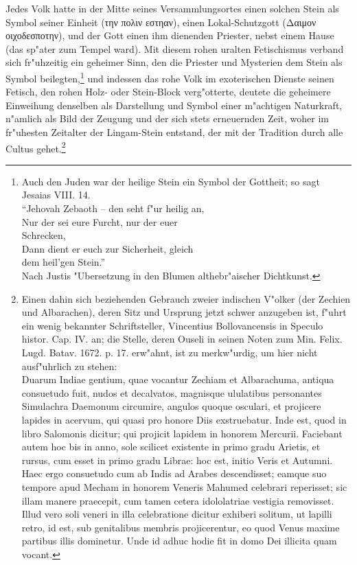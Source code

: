 \documentclass[a4paper, 11pt, oneside, polutonikogreek, german]{article}
\begin{document}
Jedes Volk hatte in der Mitte seines Versammlungsortes einen solchen Stein als Symbol seiner Einheit (την πολιν εστηαν), einen Lokal-Schutzgott (Δαιμον οιχοδεσποτην), und der Gott einen ihm dienenden Priester, nebst einem Hause (das sp"ater zum Tempel ward). Mit diesem rohen uralten Fetischismus verband sich fr"uhzeitig ein geheimer Sinn, den die Priester und Mysterien dem Stein als Symbol beilegten,\footnote{Auch den Juden war der heilige Stein ein Symbol der Gottheit; so sagt Jesaias VIII. 14.\\
"`Jehovah Zebaoth -- den seht f"ur heilig an,\\
Nur der sei eure Furcht, nur der euer\\
\hspace*{1cm} Schrecken,\\
Dann dient er euch zur Sicherheit, gleich\\
\hspace*{1cm} dem heil'gen Stein."'\\
Nach Justis "Ubersetzung in den Blumen althebr"aischer Dichtkunst.} und indessen das rohe Volk im exoterischen Dienste seinen Fetisch, den rohen Holz- oder Stein-Block verg"otterte, deutete die geheimere Einweihung denselben als Darstellung und Symbol einer m"achtigen Naturkraft, n"amlich als Bild der Zeugung und der sich stets erneuernden Zeit, woher im fr"uhesten Zeitalter der Lingam-Stein entstand, der mit der Tradition durch alle Cultus gehet.\footnote{Einen dahin sich beziehenden Gebrauch zweier indischen V"olker (der Zechien und Albarachen), deren Sitz und Ursprung jetzt schwer anzugeben ist, f"uhrt ein wenig bekannter Schriftsteller, Vincentius Bollovancensis in Speculo histor. Cap. IV. an; die Stelle, deren Ouseli in seinen Noten zum Min. Felix. Lugd. Batav. 1672. p. 17. erw"ahnt, ist zu merkw"urdig, um hier nicht ausf"uhrlich zu stehen:\\
\hspace*{0.5cm} Duarum Indiae gentium, quae vocantur Zechiam et Albarachuma, antiqua consuetudo fuit, nudos et decalvatos, magnisque ululatibus personantes Simulachra Daemonum circumire, angulos quoque osculari, et projicere lapides in acervum, qui quasi pro honore Diis exstruebatur. Inde est, quod in libro Salomonis dicitur; qui projicit lapidem in honorem Mercurii. Faciebant autem hoc bis in anno, sole scilicet existente in primo gradu Arietis, et rursus, cum esset in primo gradu Librae: hoc est, initio Veris et Autumni. Haec ergo consuetudo cum ab Indis ad Arabes descendisset; eamque suo tempore apud Mecham in honorem Veneris Mahumed celebrari reperisset; sic illam manere praecepit, cum tamen cetera idololatriae vestigia removisset. Illud vero soli veneri in illa celebratione dicitur exhiberi solitum, ut lapilli retro, id est, sub genitalibus membris projicerentur, eo quod Venus maxime partibus illis dominetur. Unde id adhuc hodie fit in domo Dei illicita quam vocant.}
\end{document}
